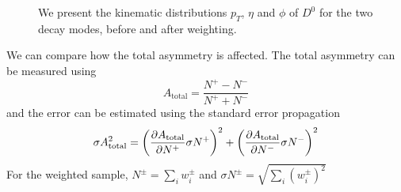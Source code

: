 \documentclass{article}
\begin{document}
    \begin{figure}[h!]
        \centering
        \hfill

        \caption{We present the kinematic distributions $p_T$, $\eta$ and $\phi$ of $D^0$ for the two decay modes, before and after weighting.}
    \end{figure}

    We can compare how the total asymmetry is affected.
    The total asymmetry can be measured using
    \begin{equation}
        A_{\text{total}} = \frac{N^+ - N^-}{N^+ + N^-}
    \end{equation}
    and the error can be estimated using the standard error propagation
    \begin{equation}
        \sigma A_{\text{total}} ^2 = \left(\pdv{A_{\text{total}}}{N^+}\sigma N^+\right)^2 + \left(\pdv{A_{\text{total}}}{N^-}\sigma N^-\right)^2
    \end{equation}
    For the weighted sample, $N^{\pm} = \sum_i w^\pm_i$ and $\sigma N^\pm = \sqrt{\sum_i (w_i^\pm)^2}$
\end{document}
